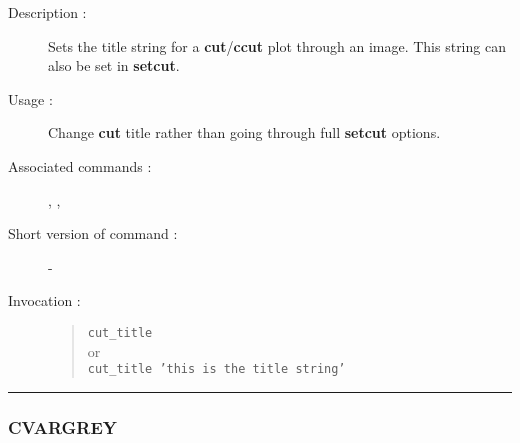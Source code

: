 \begin{description}

\item[Description :] Sets the title string for a {\bf cut}/{\bf ccut}
plot through an image.  This string can also be set in {\bf setcut}.

\item[Usage :] Change {\bf cut} title rather than going through full
{\bf setcut} options.
\item[Associated commands :] {\tt {}}, 
{\tt {}}, {\tt {}}
\item[Short version of command :] -
\item[Invocation :]

\begin{quote}{\tt  cut\_title }\\
or \\
{\tt cut\_title 'this is the title string' }
\end{quote}

\end{description}

\hrule 
\subsubsection*{\label{CVARGREY}CVARGREY}

